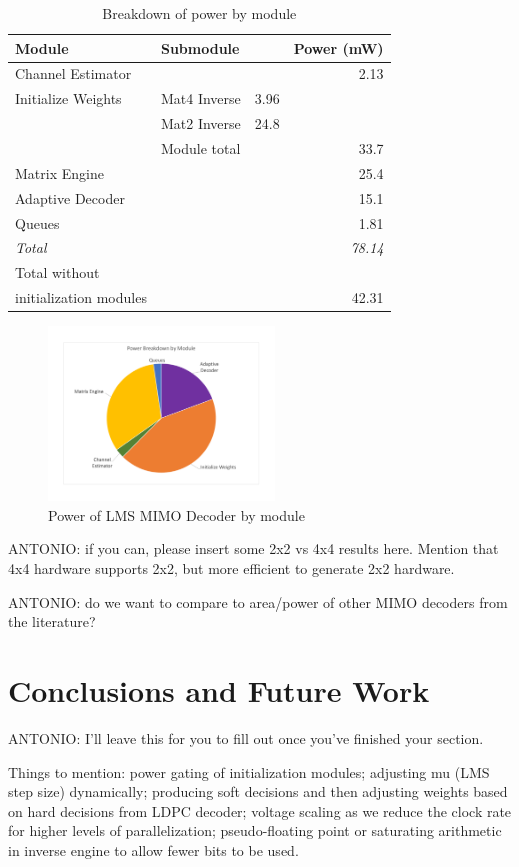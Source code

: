 \documentclass[journal]{IEEEtran}
\begin{document}
\begin{table}[!h]
\caption{Breakdown of power by module}
\label{power_breakdown_table}
\centering
\begin{tabular}{l l l r}
\hline
Module & Submodule & & Power (mW) \\
\hline
Channel Estimator & & & 2.13 \\
Initialize Weights & Mat4 Inverse & 3.96 & \\
 & Mat2 Inverse & 24.8 & \\
 & Module total & & 33.7 \\
Matrix Engine & & & 25.4 \\
Adaptive Decoder & & & 15.1 \\
Queues & & & 1.81 \\
\hline
\em{Total} & & & \em{78.14} \\
Total without & & & \\
initialization modules & & & 42.31 \\
\hline
\end{tabular}
\end{table}

\begin{figure}[!h]
\centering
\includegraphics*[width=6cm, viewport = 90 100 660 540]{images/power_breakdown_module.pdf}
\caption{Power of LMS MIMO Decoder by module}
\label{power_breakdown_module}
\end{figure}

ANTONIO: if you can, please insert some 2x2 vs 4x4 results here. Mention that 4x4 hardware supports 2x2, but more efficient to generate 2x2 hardware.

ANTONIO: do we want to compare to area/power of other MIMO decoders from the literature?


\section{Conclusions and Future Work}

ANTONIO: I'll leave this for you to fill out once you've finished your section.

Things to mention: power gating of initialization modules; adjusting mu (LMS step size) dynamically; producing soft decisions and then adjusting weights based on hard decisions from LDPC decoder; voltage scaling as we reduce the clock rate for higher levels of parallelization; pseudo-floating point or saturating arithmetic in inverse engine to allow fewer bits to be used.





\end{document}

